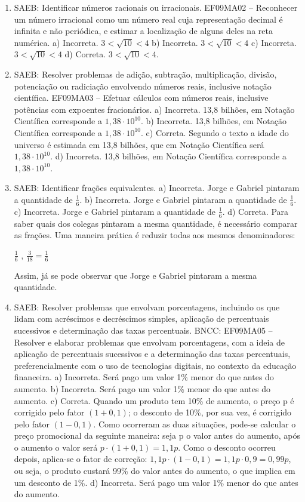 \begin{enumerate}
\item
SAEB: Identificar números racionais ou irracionais. 
EF09MA02 -- Reconhecer um número irracional como um número real cuja 
representação decimal é infinita e não periódica, e estimar a localização
de alguns deles na reta numérica. 
a) Incorreta. $3 < \sqrt{10} < 4$ 
b) Incorreta. $3 < \sqrt{10} < 4$ 
c) Incorreta. $3 < \sqrt{10} < 4$ 
d) Correta. $3 < \sqrt{10} < 4$.

\item
SAEB: Resolver problemas de adição, subtração, multiplicação, divisão, potenciação ou radiciação envolvendo números reais, inclusive notação científica.
EF09MA03 -- Efetuar cálculos com números reais, inclusive potências com
expoentes fracionários. 
a) Incorreta. 13,8 bilhões, em Notação Científica corresponde a $1,38 \cdot 10^{10}$. 
b) Incorreta. 13,8 bilhões, em Notação Científica corresponde a $1,38 \cdot 10^{10}$. 
c) Correta. Segundo o texto a idade do universo é estimada em 13,8 bilhões, que em 
Notação Científica será $1,38 \cdot 10^{10}$.
d) Incorreta. 13,8 bilhões, em Notação Científica corresponde a $1,38 \cdot 10^{10}$.

\item
SAEB: Identificar frações equivalentes.
a) Incorreta. Jorge e Gabriel pintaram a quantidade de $\frac{1}{6}$.
b) Incorreta. Jorge e Gabriel pintaram a quantidade de $\frac{1}{6}$.
c) Incorreta. Jorge e Gabriel pintaram a quantidade de $\frac{1}{6}$.
d) Correta. Para saber quais dos colegas pintaram a mesma quantidade, é 
necessário comparar as frações. Uma maneira prática é reduzir todas aos mesmos denominadores:

$\frac{1}{6}$ , $\frac{3}{18} = \frac{1}{6}$ 

Assim, já se pode observar que Jorge e Gabriel pintaram a mesma quantidade.

\item
SAEB: Resolver problemas que envolvam porcentagens, incluindo os
que lidam com acréscimos e decréscimos simples, aplicação de percentuais
sucessivos e determinação das taxas percentuais. 
BNCC: EF09MA05 -- Resolver e elaborar problemas que envolvam porcentagens, 
com a ideia de aplicação de percentuais sucessivos e a determinação das taxas
percentuais, preferencialmente com o uso de tecnologias digitais, no
contexto da educação financeira. 
a) Incorreta. Será pago um valor 1\% menor do que antes do aumento.
b) Incorreta. Será pago um valor 1\% menor do que antes do aumento.
c) Correta. Quando um produto tem 10\% de aumento, o preço p é corrigido pelo fator $(1+0,1)$; 
o desconto de 10\%, por sua vez, é corrigido pelo fator $(1-0,1)$. Como ocorreram 
as duas situações, pode-se calcular o preço promocional da seguinte maneira: seja p 
o valor antes do aumento, após o aumento o valor será $p \cdot (1+0,1) = 1,1p$. 
Como o desconto ocorreu depois, aplica-se o fator de correção: $1,1p \cdot (1-0,1) = 1,1p\cdot0,9 = 0,99p$, 
ou seja, o produto custará 99\% do valor antes do aumento, o que implica em um desconto de 1\%.
d) Incorreta. Será pago um valor 1\% menor do que antes do aumento.


\end{enumerate}
